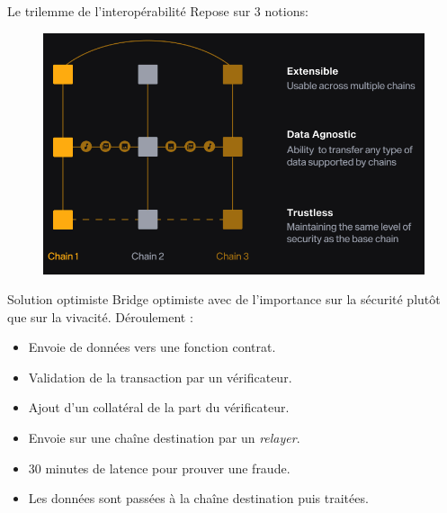 \begin{frame}{Le trilemme de l’interopérabilité}
    Repose sur 3 notions: 
    \begin{figure}
        \centering
        \includegraphics[scale = 0.7]{img/3notions.png}
    \end{figure}
    \end{frame}

\begin{frame}{Solution optimiste}
Bridge optimiste avec de l'importance sur la sécurité plutôt que sur la vivacité.
Déroulement : \newline
\begin{itemize}
    \item Envoie de données vers une fonction contrat.
    \item Validation de la transaction par un vérificateur. 
    \item Ajout d'un collatéral de la part du vérificateur. 
    \item Envoie sur une chaîne destination par un \textit{relayer}. 
    \item 30 minutes de latence pour prouver une fraude.
    \item Les données sont passées à la chaîne destination puis traitées.
\end{itemize}
\end{frame}

